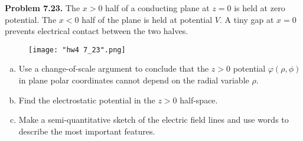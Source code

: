 \documentclass{article}
\begin{document}
\noindent\begin{minipage}{\textwidth}
\hrulefill

\textbf{Problem 7.23.}  The $x > 0$ half of a conducting plane at $z = 0$ is held at zero potential. The $x < 0$ half of the plane is held at potential $V$. A tiny gap at $x = 0$ prevents electrical contact between the two halves.
\begin{figure}[H]
\centering
\texttt{[image: "hw4 7\_23".png]}
\end{figure}
\begin{enumerate}[(a)]
    \item Use a change-of-scale argument to conclude that the $z>0$ potential $\varphi(\rho,\phi)$ in plane polar coordinates cannot depend on the radial variable $\rho$.

    \item Find the electrostatic potential in the $z > 0$ half-space.

    \item Make a semi-quantitative sketch of the electric field lines and use words to describe the most important features.
\end{enumerate}
\end{minipage}
\end{document}
